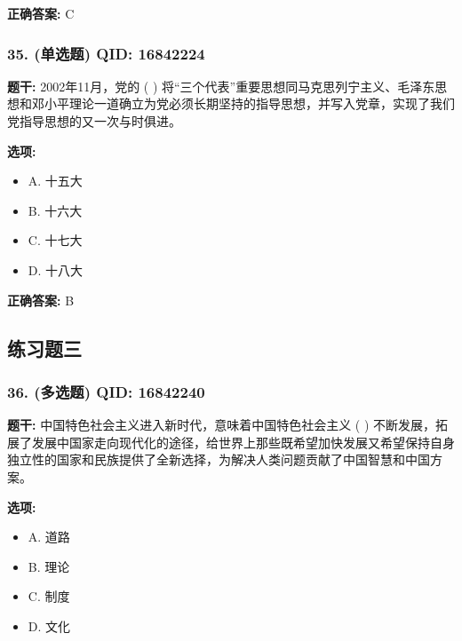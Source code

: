 \documentclass[12pt,UTF8]{ctexart}
\begin{document}
\textbf{正确答案:}
C

\vspace{0.3em}\hrulefill\vspace{0.7em}

\subsubsection*{35. (单选题) \small QID: 16842224}

\textbf{题干:}
2002年11月，党的 ( ) 将“三个代表”重要思想同马克思列宁主义、毛泽东思想和邓小平理论一道确立为党必须长期坚持的指导思想，并写入党章，实现了我们党指导思想的又一次与时俱进。

\textbf{选项:}
\begin{itemize}[leftmargin=*]

  \item A. 十五大

  \item B. 十六大

  \item C. 十七大

  \item D. 十八大

\end{itemize}

\textbf{正确答案:}
B

\vspace{0.3em}\hrulefill\vspace{0.7em}

\subsection*{练习题三}

\subsubsection*{36. (多选题) \small QID: 16842240}

\textbf{题干:}
中国特色社会主义进入新时代，意味着中国特色社会主义 ( ) 不断发展，拓展了发展中国家走向现代化的途径，给世界上那些既希望加快发展又希望保持自身独立性的国家和民族提供了全新选择，为解决人类问题贡献了中国智慧和中国方案。

\textbf{选项:}
\begin{itemize}[leftmargin=*]

  \item A. 道路

  \item B. 理论

  \item C. 制度

  \item D. 文化

\end{itemize}
\end{document}
